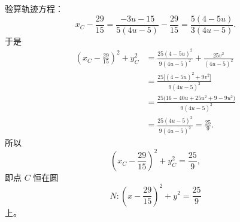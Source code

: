 \begin{solution}
验算轨迹方程：
\[
x_C-\frac{29}{15}
=\frac{-3u-15}{5(4u-5)}-\frac{29}{15}
=\frac{5(4-5u)}{3(4u-5)}.
\]
于是
\begin{align*}
\left(x_C-\frac{29}{15}\right)^2+y_C^2
&=\frac{25(4-5u)^2}{9(4u-5)^2}+\frac{25v^2}{(4u-5)^2}\\
&=\frac{25\bigl[(4-5u)^2+9v^2\bigr]}{9(4u-5)^2}\\
&=\frac{25\bigl(16-40u+25u^2+9-9u^2\bigr)}{9(4u-5)^2}\\
&=\frac{25(4u-5)^2}{9(4u-5)^2}
=\frac{25}{9}.
\end{align*}
所以
\[
\left(x_C-\frac{29}{15}\right)^2+y_C^2=\frac{25}{9},
\]
即点 $C$ 恒在圆
\[
N:\left(x-\frac{29}{15}\right)^2+y^2=\frac{25}{9}
\]
上。
\end{solution}





